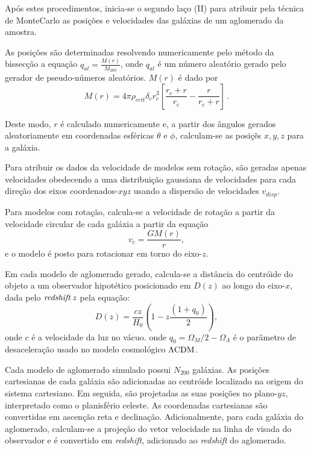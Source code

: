 \documentclass[a4paper]{report}
\begin{document}
Ap\'os estes procedimentos, inicia-se o segundo la\c co (II) para atribuir pela t\'ecnica de MonteCarlo as posi\c c\~oes e velocidades das gal\'axias de um aglomerado da amostra. 

As posi\c c\~oes s\~ao determinadas resolvendo numericamente pelo m\'etodo da bissec\c c\~ao a equa\c c\~ao $q_{al} = \frac{M(r)}{M_{200}}$, onde $q_{al}$ \'e um n\'umero aleat\'orio gerado pelo gerador de pseudo-n\'umeros aleat\'orios. $M(r)$ \'e dado por
\begin{equation}
M(r)= 4 \pi \rho_{crit} \delta_c r_c^3 \left[ \frac{r_c + r}{r_c} - \frac{r}{r_c+r}  \right] \, .
\label{nfw2}
\end{equation}

Deste modo, $r$ \'e calculado  numericamente e, a partir dos \^angulos gerados aleatoriamente em coordenadas esf\'ericas $\theta$ e $\phi$, calculam-se as posi\c c\~es $x,y,z$ para a gal\'axia.


Para atribuir os dados da velocidade de modelos sem rota\c c\~ao, s\~ao geradas apenas velocidades obedecendo a uma distribui\c c\~ao gaussiana de velocidades para cada dire\c c\~ao dos eixos coordenados-$xyz$ usando a dispers\~ao de velocidades $v_{disp}$. 

Para modelos com rota\c c\~ao, calcula-se a velocidade de rota\c c\~ao a partir da velocidade circular de cada gal\'axia a partir da equa\c c\~ao 
\begin{equation}
v_{c} = \frac{G M(r)}{r},
\label{vcirc}
\end{equation}	
e o modelo \'e posto para rotacionar em torno do eixo-$z$.

Em cada modelo de aglomerado gerado, calcula-se a dist\^ancia do centr\'oide do objeto a um observador hipot\'etico posicionado em $D(z)$ ao longo do eixo-$x$, dada pelo $\it redshift \, z$ pela equa\c c\~ao: 
\begin{equation}
D(z) = \frac{c z}{H_0} \left(1-z\frac{(1+q_0)}{2}   \right), 	
\label{distanciaaglomerado}
\end{equation}
onde $c$ \'e a velocidade da luz no v\'acuo.
onde $q_0 = \Omega_{M}/2 - \Omega_{\Lambda}$ \'e o par\^ametro de desacelera\c c\~ao usado no modelo cosmol\'ogico ${\rm \Lambda CDM}$.

Cada modelo de aglomerado simulado possui $N_{200}$ gal\'axias. As posi\c c\~oes cartesianas de cada gal\'axia s\~ao adicionadas ao centr\'oide localizado na origem do sistema cartesiano. Em seguida, s\~ao projetadas as suas posi\c c\~oes no plano-$yz$, interpretado como o planisf\'erio celeste. As coordenadas cartesianas s\~ao convertidas em ascen\c c\~ao reta e declina\c c\~ao. Adicionalmente, para cada gal\'axia do aglomerado, calculam-se a proje\c c\~ao do vetor velocidade na linha de visada do observador e \'e convertido em {\it redshift}, adicionado ao {\it redshift} do aglomerado. 
\end{document}
